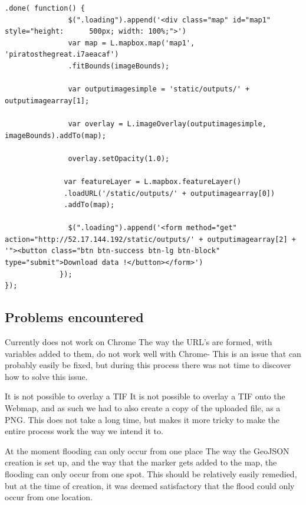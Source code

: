 \begin{lstlisting}
.done( function() {
               $(".loading").append('<div class="map" id="map1" style="height: 		500px; width: 100%;">')
               var map = L.mapbox.map('map1', 'piratosthegreat.i7aeacaf')
               .fitBounds(imageBounds);

               var outputimagesimple = 'static/outputs/' + outputimagearray[1];

               var overlay = L.imageOverlay(outputimagesimple, 				imageBounds).addTo(map);

               overlay.setOpacity(1.0);

              var featureLayer = L.mapbox.featureLayer()
              .loadURL('/static/outputs/' + outputimagearray[0])
              .addTo(map);

               $(".loading").append('<form method="get" action="http://52.17.144.192/static/outputs/' + outputimagearray[2] + '"><button class="btn btn-success btn-lg btn-block" type="submit">Download data !</button></form>')
             });
});
\end{lstlisting}

\subsection{Problems encountered}
Currently does not work on Chrome
The way the URL's are formed, with variables added to them, do not work well with Chrome- This is an issue that can probably easily be fixed, but during this process there was not time to discover how to solve this issue. 

It is not possible to overlay a TIF
It is not possible to overlay a TIF onto the Webmap, and as such we had to also create a copy of the uploaded file, as a PNG. This does not take a long time, but makes it more tricky to make the entire process work the way we intend it to.  

At the moment flooding can only occur from one place
The way the GeoJSON creation is set up, and the way that the marker gets added to the map, the flooding can only occur from one spot. This should be relatively easily remedied, but at the time of creation, it was deemed satisfactory that the flood could only occur from one location.
